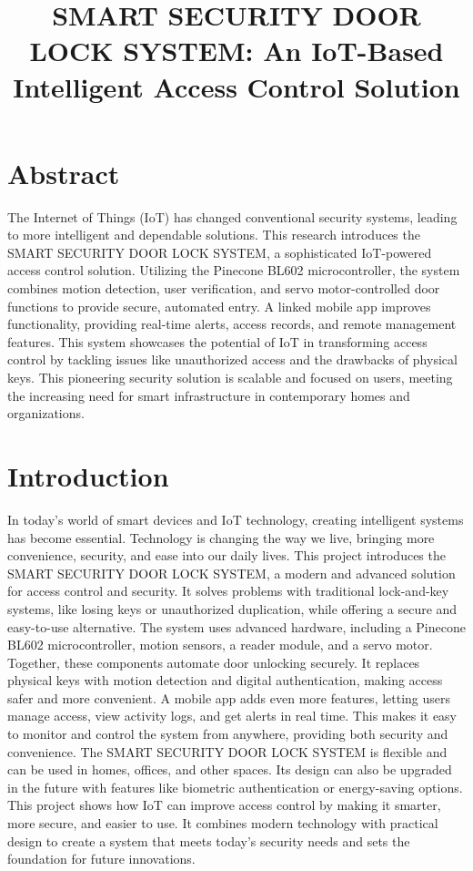 \documentclass[USenglish,oneside,twocolumn]{article}
\begin{document}
	
	

	\title{\huge SMART SECURITY DOOR LOCK SYSTEM: An IoT-Based Intelligent Access Control Solution}


	
 \section{Abstract}
  The Internet of Things (IoT) has changed conventional security systems, leading to more intelligent and dependable solutions. This research introduces the SMART SECURITY DOOR LOCK SYSTEM, a sophisticated IoT-powered access control solution. Utilizing the Pinecone BL602 microcontroller, the system combines motion detection, user verification, and servo motor-controlled door functions to provide secure, automated entry. A linked mobile app improves functionality, providing real-time alerts, access records, and remote management features. This system showcases the potential of IoT in transforming access control by tackling issues like unauthorized access and the drawbacks of physical keys. This pioneering security solution is scalable and focused on users, meeting the increasing need for smart infrastructure in contemporary homes and organizations.
\maketitle
	
	\section{Introduction}
    \label{sec:intro}
    In today’s world of smart devices and IoT technology, creating intelligent systems has become essential. Technology is changing the way we live, bringing more convenience, security, and ease into our daily lives. This project introduces the SMART SECURITY DOOR LOCK SYSTEM, a modern and advanced solution for access control and security. It solves problems with traditional lock-and-key systems, like losing keys or unauthorized duplication, while offering a secure and easy-to-use alternative. The system uses advanced hardware, including a Pinecone BL602 microcontroller, motion sensors, a reader module, and a servo motor. Together, these components automate door unlocking securely. It replaces physical keys with motion detection and digital authentication, making access safer and more convenient. A mobile app adds even more features, letting users manage access, view activity logs, and get alerts in real time. This makes it easy to monitor and control the system from anywhere, providing both security and convenience. The SMART SECURITY DOOR LOCK SYSTEM is flexible and can be used in homes, offices, and other spaces. Its design can also be upgraded in the future with features like biometric authentication or energy-saving options. This project shows how IoT can improve access control by making it smarter, more secure, and easier to use. It combines modern technology with practical design to create a system that meets today’s security needs and sets the foundation for future innovations.
	
\end{document}
